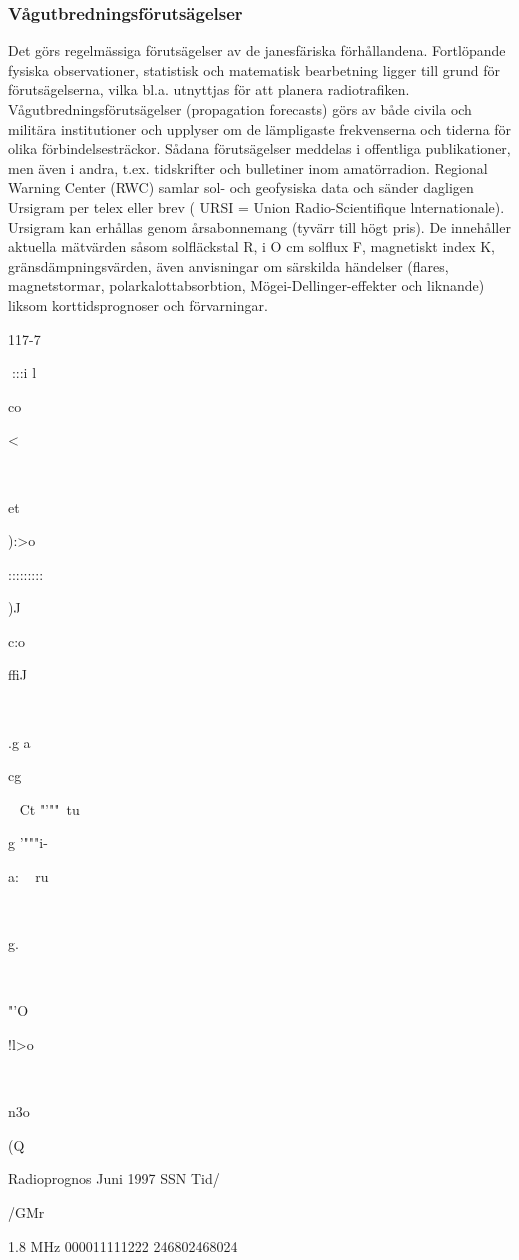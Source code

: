 \subsubsection{Vågutbredningsförutsägelser}
Det görs regelmässiga förutsägelser av de
janesfäriska förhållandena. Fortlöpande fysiska observationer, statistisk och matematisk bearbetning ligger till grund för förutsägelserna, vilka bl.a. utnyttjas för att planera
radiotrafiken. Vågutbredningsförutsägelser
(propagation forecasts) görs av både civila
och militära institutioner och upplyser om de
lämpligaste frekvenserna och tiderna för olika förbindelsesträckor. Sådana förutsägelser meddelas i offentliga publikationer, men
även i andra, t.ex. tidskrifter och bulletiner
inom amatörradion.
Regional Warning Center (RWC) samlar
sol- och geofysiska data och sänder dagligen Ursigram per telex eller brev ( URSI =
Union Radio-Scientifique lnternationale).
Ursigram kan erhållas genom årsabonnemang (tyvärr till högt pris). De innehåller
aktuella mätvärden såsom solfläckstal R, i O
cm solflux F, magnetiskt index K, gränsdämpningsvärden, även anvisningar om särskilda händelser (flares,
magnetstormar, polarkalottabsorbtion, Mögei-Dellinger-effekter och liknande) liksom
korttidsprognoser och förvarningar.

117-7

:::i
l

co

<

~

et

):>o

:::::::::

)J

c:o

ffiJ

~

.g
a

cg

~
Ct
"'""\
tu

g
'"""i-

a:
~
ru

~

g.
~

~

"'O

!l>o

~

n3o

(Q

Radioprognos Juni 1997 SSN
Tid/

/GMr

1.8 MHz
000011111222
246802468024

